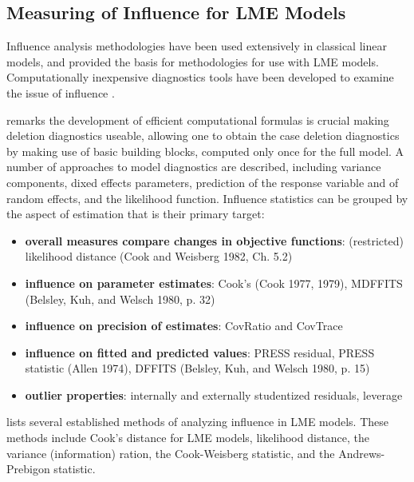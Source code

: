 \documentclass[12pt, a4paper]{report}
\theoremstyle{plain}
\theoremstyle{definition}
\theoremstyle{remark}
\begin{document}
	\subsection{Measuring of Influence for LME Models}
	Influence analysis methodologies have been used extensively in classical linear models, and provided the basis for methodologies for use with LME models. Computationally inexpensive diagnostics tools have been developed to examine the issue of influence \citep{Zewotir}. 
	
	
	\citet{Zewotir} remarks the development of efficient computational formulas is crucial making deletion diagnostics useable, allowing one to obtain the  case deletion diagnostics by making use of basic building blocks, computed only once for the full model. A number of approaches to model diagnostics are described, including variance components, dixed effects parameters, prediction of the response variable and of random effects, and the likelihood function. Influence statistics can be grouped by the aspect of estimation that is their primary target:
	\begin{itemize}
		\item \textbf{overall measures compare changes in objective functions}: (restricted) likelihood distance (Cook and Weisberg 1982, Ch. 5.2)
		\item \textbf{influence on parameter estimates}: Cook's  (Cook 1977, 1979), MDFFITS (Belsley, Kuh, and Welsch 1980, p. 32)
		\item \textbf{influence on precision of estimates}: CovRatio and CovTrace
		\item \textbf{influence on fitted and predicted values}: PRESS residual, PRESS statistic (Allen 1974), DFFITS (Belsley, Kuh, and Welsch 1980, p. 15)
		\item \textbf{outlier properties}: internally and externally studentized residuals, leverage
	\end{itemize}
	
	
	\citet{Zewotir} lists several established methods of analyzing influence in LME models. These methods include Cook's distance for LME models,
	 likelihood distance,
	the variance (information) ration,
	the  Cook-Weisberg statistic, and
	the  Andrews-Prebigon statistic.
	
\end{document}
